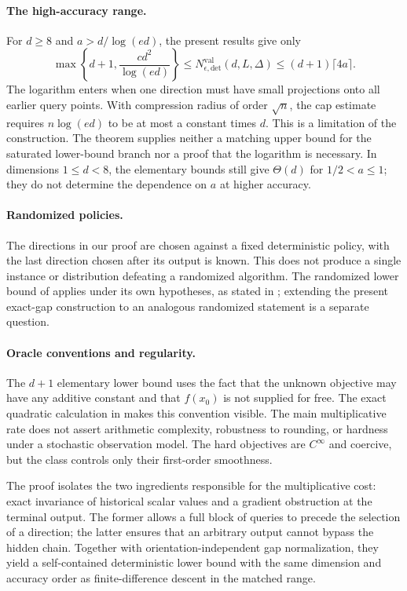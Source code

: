 \documentclass[11pt]{article}
\numberwithin{equation}{section}
\theoremstyle{definition}
\theoremstyle{remark}
\newcommand{\Nval}{N_{\epsilon,\mathrm{det}}^{\mathrm{val}}}
\begin{document}
\paragraph{The high-accuracy range.}
For $d\geq8$ and $a>d/\log(ed)$, the present results give only
\begin{equation}
 \max\!\left\{d+1,\frac{cd^2}{\log(ed)}\right\}
 \leq\Nval(d,L,\Delta)
 \leq(d+1)\lceil4a\rceil.
 \label{eq:remaining-range}
\end{equation}
The logarithm enters when one direction must have small projections onto
all earlier query points. With compression radius of order $\sqrt n$,
the cap estimate requires $n\log(ed)$ to be at most a constant times $d$.
This is a limitation of the construction. The theorem supplies neither a
matching upper bound for the saturated lower-bound branch nor a proof
that the logarithm is necessary. In dimensions $1\leq d<8$, the elementary
bounds still give $\Theta(d)$ for $1/2<a\leq1$; they do not determine the
dependence on $a$ at higher accuracy.

\paragraph{Randomized policies.}
The directions in our proof are chosen against a fixed deterministic
policy, with the last direction chosen after its output is known. This
does not produce a single instance or distribution defeating a randomized
algorithm. The randomized lower bound of \citet{XY2026} applies under its
own hypotheses, as stated in ; extending the present
exact-gap construction to an analogous randomized statement is a separate
question.

\paragraph{Oracle conventions and regularity.}
The $d+1$ elementary lower bound uses the fact that the unknown objective
may have any additive constant and that $f(x_0)$ is not supplied for free.
The exact quadratic calculation in  makes this
convention visible. The main multiplicative rate does not assert
arithmetic complexity, robustness to rounding, or hardness under a
stochastic observation model. The hard objectives are $C^\infty$ and
coercive, but the class controls only their first-order smoothness.

The proof isolates the two ingredients responsible for the multiplicative
cost: exact invariance of historical scalar values and a gradient
obstruction at the terminal output. The former allows a full block of
queries to precede the selection of a direction; the latter ensures that
an arbitrary output cannot bypass the hidden chain. Together with
orientation-independent gap normalization, they yield a self-contained
deterministic lower bound with the same dimension and accuracy order as
finite-difference descent in the matched range.
\end{document}
